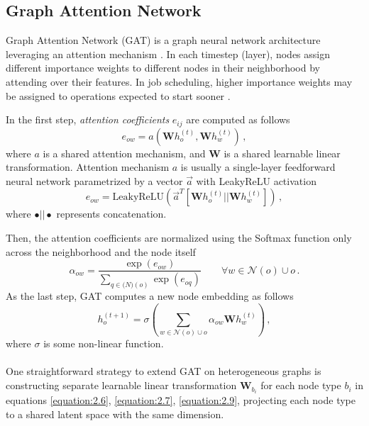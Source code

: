 \subsection{Graph Attention Network}
Graph Attention Network (GAT) is a graph neural network architecture leveraging an attention mechanism \cite{veličković2018graph}. In each timestep (layer), nodes assign different importance weights to different nodes in their neighborhood by attending over their features. In job scheduling, higher importance weights may be assigned to operations expected to start sooner \cite{9826438}.  
\newpage
\par
In the first step, \textit{attention coefficients} $e_{ij}$ are computed as follows \cite{veličković2018graph, 9826438}
\begin{equation} \label{equation:2.6}
	e_{ow} = a\left ( \boldsymbol{W} h_o^{(t)}, \boldsymbol{W} h_w^{(t)}  \right ) \, ,
\end{equation}  
where $a$ is a shared attention mechanism, and $\boldsymbol{W}$ is a shared learnable linear transformation. Attention mechanism $a$ is usually a single-layer feedforward neural network parametrized by a vector $\vec{a}$ with LeakyReLU activation \cite{veličković2018graph, 9826438, DBLP:journals/corr/abs-2105-14491}
\begin{equation} \label{equation:2.7}
	e_{ow} = \text{LeakyReLU}\left ( \vec{a}^T \left [ \boldsymbol{W}h_o^{(t)} || \boldsymbol{W}h_w^{(t)} \right ] \right ) \, ,
\end{equation}
where $\bullet||\bullet$ represents concatenation.
\par
Then, the attention coefficients are normalized using the Softmax function only across the neighborhood and the node itself \cite{veličković2018graph, 9826438}
\begin{equation}
	\alpha_{ow} = \frac{\exp(e_{ow})}{\sum_{q \in \mathcal(N)(o)} \exp(e_{oq})} \hspace{2em} \forall w \in \mathcal{N}(o) \cup {o} \, .
\end{equation}
As the last step, GAT computes a new node embedding as follows \cite{veličković2018graph, 9826438}
\begin{equation} \label{equation:2.9}
	h_o^{(t+1)} = \sigma \left ( \sum_{w \in \mathcal{N}(o) \cup {o}} \alpha_{ow} \boldsymbol{W} h_w^{(t)} \right ) \, ,
\end{equation}
where $\sigma$ is some non-linear function.\\
\\
One straightforward strategy to extend GAT on heterogeneous graphs is constructing separate learnable linear transformation $\boldsymbol{W}_{b_i}$ for each node type $b_i$ in equations \ref{equation:2.6}, \ref{equation:2.7}, \ref{equation:2.9}, projecting each node type to a shared latent space with the same dimension.